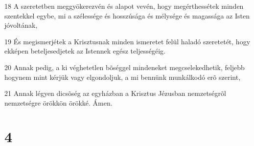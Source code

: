 \par 18 A szeretetben meggyökerezvén és alapot vevén, hogy megérthessétek minden szentekkel egybe, mi a szélessége és hosszúsága és mélysége és magassága az Isten jóvoltának,
\par 19 És megismerjétek a Krisztusnak minden ismeretet felül haladó szeretetét, hogy ekképen beteljesedjetek az Istennek egész teljességéig.
\par 20 Annak pedig, a ki véghetetlen bõséggel mindeneket megcselekedhetik, feljebb hogynem mint kérjük vagy elgondoljuk, a mi bennünk munkálkodó erõ szerint,
\par 21 Annak légyen dicsõség az egyházban a Krisztus Jézusban nemzetségrõl nemzetségre örökkön örökké. Ámen.

\chapter{4}

